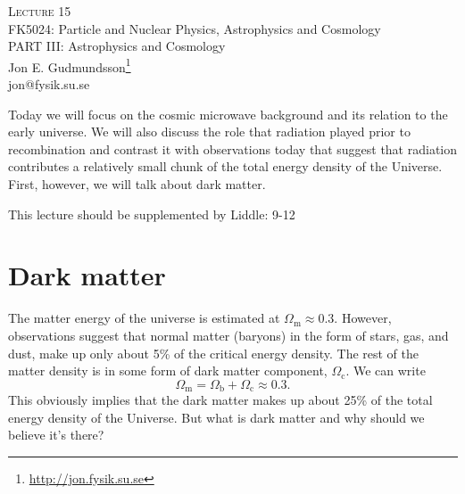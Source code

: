 \documentclass[a4paper,12pt]{article}
\theoremstyle{remark}
\newcommand{\mrm}[1]{\mathrm{#1}}
\renewcommand{\=}[1]{\stackrel{#1}{=}} %
\newcommand{\linkc}[1]{\textcolor{linkc}{#1}}
\theoremstyle{plain}
\theoremstyle{definition}
\begin{document}
\fontsize{5mm}{6mm}\selectfont\thispagestyle{empty}

\thispagestyle{empty}
\begin{center}
\textsc{Lecture 15}\\[1.5ex]
{\Huge FK5024: Particle and Nuclear Physics, Astrophysics and Cosmology\\}
\vspace{3mm}
{\large PART III: Astrophysics and Cosmology \\}
Jon E. Gudmundsson\footnote{\href{http://jon.fysik.su.se}{\linkc{http://jon.fysik.su.se}}} \\
\linkc{jon@fysik.su.se}
\end{center}
Today we will focus on the cosmic microwave background and its relation to the early universe. We will also discuss the role that radiation played prior to recombination and contrast it with observations today that suggest that radiation contributes a relatively small chunk of the total energy density of the Universe. First, however, we will talk about dark matter.
\begin{attention}
This lecture should be supplemented by Liddle: 9-12
\end{attention}

\section{Dark matter}
The matter energy of the universe is estimated at $\Omega _\mrm{m} \approx 0.3$. However, observations suggest that normal matter (baryons) in the form of stars, gas, and dust, make up only about 5\% of the critical energy density. The rest of the matter density is in some form of dark matter component, $\Omega _\mrm{c}$. We can write 
\begin{equation}
\Omega _\mrm{m} = \Omega _\mrm{b} + \Omega _\mrm{c} \approx 0.3.
\end{equation}
This obviously implies that the dark matter makes up about 25\% of the total energy density of the Universe. But what is dark matter and why should we believe it's there?
\end{document}
